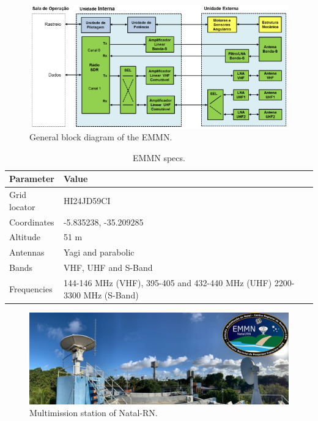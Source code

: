 \begin{figure}[!ht]
    \begin{center}
        \includegraphics[width=\textwidth]{figures/emmn-bd}
        \caption{General block diagram of the EMMN.}
        \label{fig:emmn-bd}
    \end{center}
\end{figure}

\begin{table}[!h]
    \centering
    \begin{tabular}{lC{6cm}}
        \toprule[1.5pt]
        \textbf{Parameter} & \textbf{Value} \\
        \midrule
        Grid locator    & HI24JD59CI \\
        Coordinates     & -5.835238, -35.209285 \\
        Altitude        & 51 m \\
        Antennas        & Yagi and parabolic \\
        Bands           & VHF, UHF and S-Band\\
        Frequencies     & 144-146 MHz (VHF), 395-405 and 432-440 MHz (UHF) 2200-3300 MHz (S-Band)\\
        \bottomrule[1.5pt]
    \end{tabular}
    \caption{EMMN specs.}
    \label{tab:emmn-info}
\end{table}

\begin{figure}[!ht]
    \begin{center}
        \includegraphics[width=\textwidth]{figures/inpe-emmn}
        \caption{Multimission station of Natal-RN.}
        \label{fig:emmn}
    \end{center}
\end{figure}

